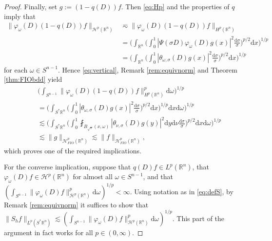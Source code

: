 \documentclass{amsart}
\newcommand {\ud}{\mathrm{d}}
\newcommand {\HT}{\mathcal{H}}
\newcommand {\Hp}{\mathcal{H}^{p}_{FIO}(\Rn)}
\newcommand {\ph}{\varphi}
\newcommand {\Rn}{\mathbb{R}^{n}}
\newcommand {\Sp}{S^{*}\Rn}
\newcommand {\w}{\omega}
\theoremstyle{definition}
\numberwithin{equation}{section}
\begin{document}
\begin{proof}
Finally, set $g:=(1-q(D))f$. Then \eqref{eq:Hp} and the properties of $q$ imply that
\begin{align*}
\|\ph_{\w}(D)(1-q(D))f\|_{\HT^{p}(\Rn)}&\eqsim\|\ph_{\w}(D)(1-q(D))f\|_{H^{p}(\Rn)}\\
&=\Big(\int_{\Rn}\Big(\int_{0}^{1}|\Psi(\sigma D)\ph_{\w}(D)g(x)|^{2}\frac{\ud\sigma}{\sigma}\Big)^{p/2}\ud x\Big)^{1/p}\\
&=\Big(\int_{\Rn}\Big(\int_{0}^{1}|\theta_{\w,\sigma}(D)g(x)|^{2}\frac{\ud\sigma}{\sigma}\Big)^{p/2}\ud x\Big)^{1/p}
\end{align*}
for each $\w\in S^{n-1}$. Hence \eqref{eq:vertical}, Remark \ref{rem:equivnorm} and Theorem \ref{thm:FIObdd} yield 
\begin{align*}
&\Big(\int_{S^{n-1}}\|\ph_{\w}(D)(1-q(D))f\|_{H^{p}(\Rn)}^{p}\ud\w\Big)^{1/p}\\
&=\Big(\int_{\Sp}\Big(\int_{0}^{1}|\theta_{\w,\sigma}(D)g(x)|^{2}\frac{\ud\sigma}{\sigma}\Big)^{p/2}\ud x\Big)^{1/p}\ud x\ud\w\Big)^{1/p}\\
&\lesssim \Big(\int_{\Sp}\Big(\int_{0}^{1}\fint_{B_{\sqrt{\sigma}}(x,\w)}|\theta_{\nu,\sigma}(D)g(y)|^{2}\ud y\ud\nu\frac{\ud\sigma}{\sigma}\Big)^{p/2}\ud x\ud\w\Big)^{1/p}\\
&\lesssim \|g\|_{\Hp}\lesssim \|f\|_{\Hp},
\end{align*}
which proves one of the required implications.

For the converse implication, suppose that $q(D)f\in L^{p}(\Rn)$, that $\ph_{\w}(D)f\in \HT^{p}(\Rn)$ for almost all $\w\in S^{n-1}$, and that $(\int_{S^{n-1}}\|\ph_{\w}(D)f\|_{\HT^{p}(\Rn)}^{p}\ud \w)^{1/p}<\infty$. Using notation as in \eqref{eq:defS}, by Remark \ref{rem:equivnorm} it suffices to show that $\|S_{h}f\|_{L^{p}(\Sp)}\lesssim (\int_{S^{n-1}}\|\ph_{\w}(D)f\|_{\HT^{p}(\Rn)}^{p}\ud \w)^{1/p}$. This part of the argument in fact works for all $p\in(0,\infty)$.


\end{proof}
\end{document}
